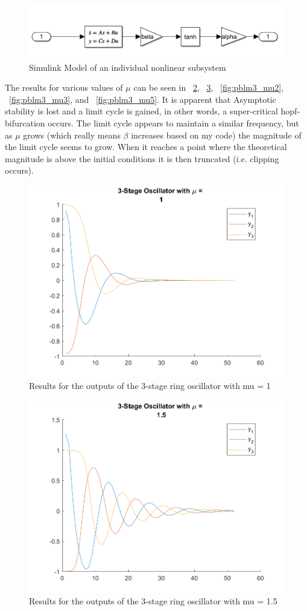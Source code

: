 \documentclass[letter]{article}
\begin{document}
\begin{figure}[h]
	\centering
	\includegraphics[width=0.7\linewidth]{fig/sim_model_HW6_pblm3_subsystem}
	\caption{Simulink Model of an individual nonlinear subsystem}
	\label{fig:simmodelhw6pblm3subsystem}
\end{figure}


The results for various values of $\mu$ can be seen in \figurename \  \ref{fig:pblm3_mu1}, \figurename \ \ref{fig:pblm3_mu15}, \figurename \ \ref{fig:pblm3_mu2}, \figurename \ \ref{fig:pblm3_mu3}, and \figurename \ \ref{fig:pblm3_mu5}. It is apparent that Asymptotic stability is lost and a limit cycle is gained, in other words, a super-critical hopf-bifurcation occurs. The limit cycle appears to maintain a similar frequency, but as $\mu$ grows (which really means $\beta$ increases based on my code) the magnitude of the limit cycle seems to grow. When it reaches a point where the theoretical magnitude is above the initial conditions it is then truncated (i.e. clipping occurs).


\begin{figure}[p]
	\centering
	\includegraphics[width=0.7\linewidth]{fig/HW6_pblm3_results_mu_1}
	\caption{Results for the outputs of the 3-stage ring oscillator with mu = 1}
	\label{fig:pblm3_mu1}
\end{figure}

\begin{figure}[p]
	\centering
	\includegraphics[width=0.7\linewidth]{fig/HW6_pblm3_results_mu_1.5}
	\caption{Results for the outputs of the 3-stage ring oscillator with mu = 1.5}
	\label{fig:pblm3_mu15}
\end{figure}
\end{document}
